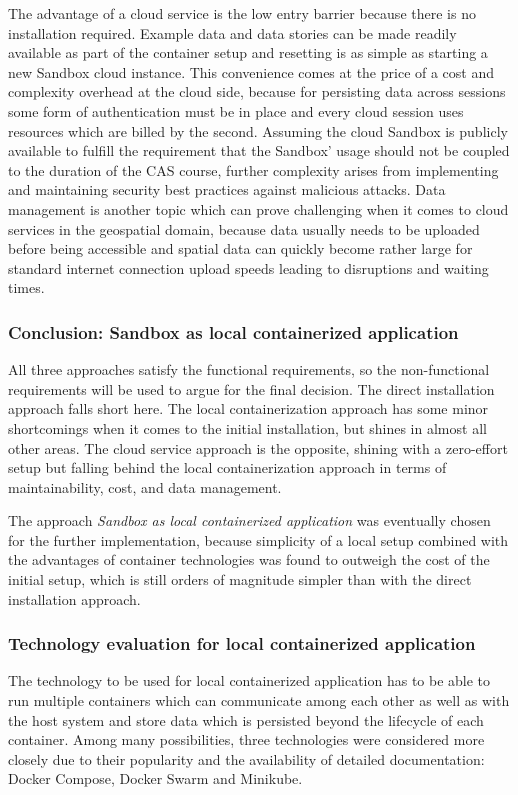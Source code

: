\documentclass[11pt, a4paper, oneside, parskip=full-]{scrartcl}
\begin{document}
The advantage of a cloud service is the low entry barrier because there is no
installation required. Example data and data stories can be made readily
available as part of the container setup and resetting is as simple as starting
a new Sandbox cloud instance. This convenience comes at the price of a cost and
complexity overhead at the cloud side, because for persisting data across
sessions some form of authentication must be in place and every cloud session
uses resources which are billed by the second. Assuming the cloud Sandbox is
publicly available to fulfill the requirement that the Sandbox' usage should not
be coupled to the duration of the CAS course, further complexity arises from
implementing and maintaining security best practices against malicious attacks.
Data management is another topic which can prove challenging when it comes to
cloud services in the geospatial domain, because data usually needs to be
uploaded before being accessible and spatial data can quickly become rather
large for standard internet connection upload speeds leading to disruptions and
waiting times.

\subsubsection*{Conclusion: Sandbox as local containerized application}
All three approaches satisfy the functional requirements, so the non-functional
requirements will be used to argue for the final decision. The direct
installation approach falls short here. The local containerization approach has
some minor shortcomings when it comes to the initial installation, but shines in
almost all other areas. The cloud service approach is the opposite, shining with
a zero-effort setup but falling behind the local containerization approach in
terms of maintainability, cost, and data management.

The approach \emph{Sandbox as local containerized application} was eventually
chosen for the further implementation, because simplicity of a local setup
combined with the advantages of container technologies was found to outweigh the
cost of the initial setup, which is still orders of magnitude simpler than with
the direct installation approach.

\subsubsection{Technology evaluation for local containerized application}
The technology to be used for local containerized application has to be able to
run multiple containers which can communicate among each other as well as with
the host system and store data which is persisted beyond the lifecycle of each
container. Among many possibilities, three technologies were considered more
closely due to their popularity and the availability of detailed documentation:
Docker Compose, Docker Swarm and Minikube.
\end{document}
